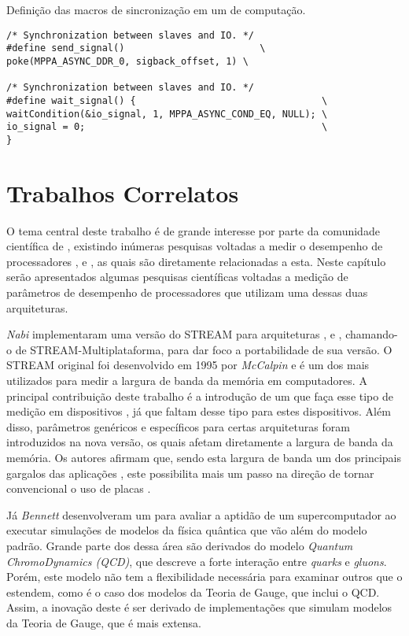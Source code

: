 \begin{listing}[tb]
\caption{Definição das macros de sincronização em um \cluster de computação.}
\label{lst:macrossynccc}
\begin{verbatim}
/* Synchronization between slaves and IO. */
#define send_signal()                        \
poke(MPPA_ASYNC_DDR_0, sigback_offset, 1) \

/* Synchronization between slaves and IO. */
#define wait_signal() {                                 \
waitCondition(&io_signal, 1, MPPA_ASYNC_COND_EQ, NULL); \
io_signal = 0;                                          \
}     
\end{verbatim}
\fonte{o autor.}
\end{listing}

\chapter{Trabalhos Correlatos}
\label{ch:trabcorrelatos}

O tema central deste trabalho é de grande interesse por parte da comunidade científica de \HPC, existindo inúmeras pesquisas voltadas a medir o desempenho de processadores \multicore, \manycore e \chips \FPGA, as quais são diretamente relacionadas a esta. Neste capítulo serão apresentados algumas pesquisas científicas voltadas a medição de parâmetros de desempenho de processadores que utilizam uma dessas duas arquiteturas.

\textit{Nabi} \etal \cite{nabifpgabenchmark} implementaram uma versão do \bench STREAM para arquiteturas \FPGA, \GPUs e \CPUs, chamando-o de STREAM-Multiplataforma, para dar foco a portabilidade de sua versão. O \bench STREAM original foi desenvolvido em 1995 por \textit{McCalpin} \etal \cite{mccalpinstreambench} e é um dos \benchs mais utilizados para medir a largura de banda da memória em computadores. A principal contribuição deste trabalho é a introdução de um \bench que faça esse tipo de medição em dispositivos \FPGA, já que faltam \benchs desse tipo para estes dispositivos. Além disso, parâmetros genéricos e específicos para certas arquiteturas foram introduzidos na nova versão, os quais afetam diretamente a largura de banda da memória. Os autores afirmam que, sendo esta largura de banda um dos principais gargalos das aplicações \HPC \cite{asanoviclandscapeparallel}, este \bench possibilita mais um passo na direção de tornar convencional o uso de placas \FPGA.

Já \textit{Bennett} \etal \cite{bennettqcdbench} desenvolveram um \bench para avaliar a aptidão de um supercomputador ao executar simulações de modelos da física quântica que vão além do modelo padrão. Grande parte dos \benchs dessa área são derivados do modelo \textit{Quantum ChromoDynamics (QCD)}, que descreve a forte interação entre \textit{quarks} e \textit{gluons}. Porém, este modelo não tem a flexibilidade necessária para examinar outros que o estendem, como é o caso dos modelos da Teoria de Gauge, que inclui o QCD. Assim, a inovação deste \bench é ser derivado de implementações que simulam modelos da Teoria de Gauge, que é mais extensa. 

